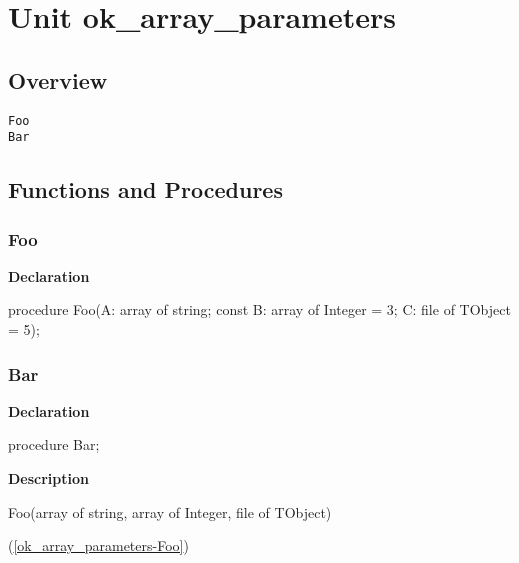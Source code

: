 \documentclass{report}
\begin{document}
\newlength{\tmplength}
\chapter{Unit ok{\_}array{\_}parameters}
\section{Overview}
\begin{description}
\item[\texttt{Foo}]
\item[\texttt{Bar}]
\end{description}
\section{Functions and Procedures}
\subsection*{Foo}
\begin{list}{}{
\setlength{\itemindent}{0cm}
\setlength{\listparindent}{0cm}
\setlength{\leftmargin}{\evensidemargin}
\addtolength{\leftmargin}{\tmplength}
\settowidth{\labelsep}{X}
\addtolength{\leftmargin}{\labelsep}
\setlength{\labelwidth}{\tmplength}
}
\begin{flushleft}
\item[\textbf{Declaration}\hfill]
\begin{ttfamily}
procedure Foo(A: array of string; const B: array of Integer = 3; C: file of TObject = 5);\end{ttfamily}


\end{flushleft}
\end{list}
\subsection*{Bar}
\begin{list}{}{
\setlength{\itemindent}{0cm}
\setlength{\listparindent}{0cm}
\setlength{\leftmargin}{\evensidemargin}
\addtolength{\leftmargin}{\tmplength}
\settowidth{\labelsep}{X}
\addtolength{\leftmargin}{\labelsep}
\setlength{\labelwidth}{\tmplength}
}
\begin{flushleft}
\item[\textbf{Declaration}\hfill]
\begin{ttfamily}
procedure Bar;\end{ttfamily}


\end{flushleft}
\par
\item[\textbf{Description}]
\begin{ttfamily}Foo(array of string, array of Integer, file of TObject)\end{ttfamily}(\ref{ok_array_parameters-Foo})

\end{list}
\end{document}
